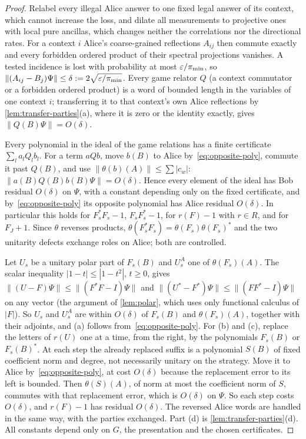 \begin{proof}
Relabel every illegal Alice answer to one fixed legal answer of its context, which cannot increase the loss, and dilate
all measurements to projective ones with local pure ancillas, which changes neither the correlations nor the directional
rates. For a context $i$ Alice's coarse-grained reflections $A_{ij}$ then commute exactly and every forbidden ordered
product of their spectral projections vanishes. A tested incidence is lost with probability at most $\varepsilon/\pi_{\min}$,
so $\|(A_{ij}-B_j)\Psi\|\le\delta:=2\sqrt{\varepsilon/\pi_{\min}}$. Every game relator $Q$ (a context commutator or a forbidden
ordered product) is a word of bounded length in the variables of one context $i$; transferring it to that context's own
Alice reflections by \cref{lem:transfer-parties}(a), where it is zero or the identity exactly, gives
$\|Q(B)\Psi\|=O(\delta)$.

Every polynomial in the ideal of the game relations has a finite certificate $\sum_la_lQ_lb_l$. For a term $aQb$, move
$b(B)$ to Alice by~\eqref{eq:opposite-poly}, commute it past $Q(B)$, and use $\|\theta(b)(A)\|\le\sum|c_w|$:
$\|a(B)Q(B)b(B)\Psi\|=O(\delta)$. Hence every element of the ideal has Bob residual $O(\delta)$ on $\Psi$, with a
constant depending only on the fixed certificate, and by~\eqref{eq:opposite-poly} its opposite polynomial has Alice
residual $O(\delta)$. In particular this holds for $F_s^*F_s-1$, $F_sF_s^*-1$, for $r(F)-1$ with $r\in R$, and for
$F_J+1$. Since $\theta$ reverses products, $\theta(F_s^*F_s)=\theta(F_s)\theta(F_s)^*$ and the two unitarity defects
exchange roles on Alice; both are controlled.

Let $U_s$ be a unitary polar part of $F_s(B)$ and $U_s^A$ one of $\theta(F_s)(A)$. The scalar inequality
$|1-t|\le|1-t^2|$, $t\ge0$, gives $\|(U-F)\Psi\|\le\|(F^*F-I)\Psi\|$ and $\|(U^*-F^*)\Psi\|\le\|(FF^*-I)\Psi\|$ on any
vector (the argument of \cref{lem:polar}, which uses only functional calculus of $|F|$). So $U_s$ and $U_s^A$ are within
$O(\delta)$ of $F_s(B)$ and $\theta(F_s)(A)$, together with their adjoints, and (a) follows from~\eqref{eq:opposite-poly}.
For (b) and (c), replace the letters of $r(U)$ one at a time, from the right, by the polynomials $F_s(B)$ or $F_s(B)^*$. At
each step the already replaced suffix is a polynomial $S(B)$ of fixed coefficient norm and degree, not necessarily unitary on
the strategy. Move it to Alice by~\eqref{eq:opposite-poly}, at cost $O(\delta)$ because the replacement error to its left is
bounded. Then $\theta(S)(A)$, of norm at most the coefficient norm of $S$, commutes with that replacement error, which is
$O(\delta)$ on $\Psi$. So each step costs $O(\delta)$, and $r(F)-1$ has residual $O(\delta)$. The reversed Alice words are
handled in the same way, with the parties exchanged. Part (d) is
\cref{lem:transfer-parties}(d). All constants depend only on $G$, the presentation and the chosen certificates.
\end{proof}

